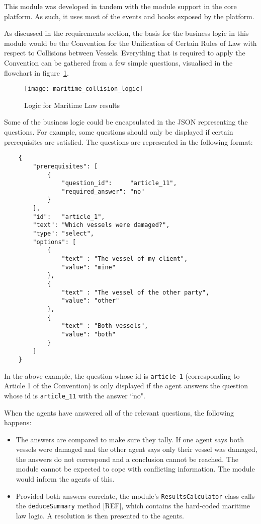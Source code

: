 This module was developed in tandem with the module support in the core platform. As such, it uses most of the events and hooks exposed by the platform.

As discussed in the requirements section, the basis for the business logic in this module would be the Convention for the Unification of Certain Rules of Law with respect to Collisions between Vessels. Everything that is required to apply the Convention can be gathered from a few simple questions, visualised in the flowchart in figure~\ref{uml:maritimeLogic}.

\begin{figure}[h!]
  \centering
    \ifimages
    \texttt{[image: maritime\_collision\_logic]}
    \fi
  \caption{Logic for Maritime Law results}
  \label{uml:maritimeLogic}
\end{figure}

Some of the business logic could be encapsulated in the JSON representing the questions. For example, some questions should only be displayed if certain prerequisites are satisfied. The questions are represented in the following format:

\begin{minipage}{\textwidth}
\begin{lstlisting}
    {
        "prerequisites": [
            {
                "question_id":     "article_11",
                "required_answer": "no"
            }
        ],
        "id":   "article_1",
        "text": "Which vessels were damaged?",
        "type": "select",
        "options": [
            {
                "text" : "The vessel of my client",
                "value": "mine"
            },
            {
                "text" : "The vessel of the other party",
                "value": "other"
            },
            {
                "text" : "Both vessels",
                "value": "both"
            }
        ]
    }
\end{lstlisting}
\end{minipage}

In the above example, the question whose id is \lstinline{article_1} (corresponding to Article 1 of the Convention) is only displayed if the agent answers the question whose id is \lstinline{article_11} with the answer ``no".

When the agents have answered all of the relevant questions, the following happens:

\begin{itemize}
    \item The answers are compared to make sure they tally. If one agent says both vessels were damaged and the other agent says only their vessel was damaged, the answers do not correspond and a conclusion cannot be reached. The module cannot be expected to cope with conflicting information. The module would inform the agents of this.
    \item Provided both answers correlate, the module's \lstinline{ResultsCalculator} class calls the \lstinline{deduceSummary} method [REF], which contains the hard-coded maritime law logic. A resolution is then presented to the agents.
\end{itemize}

